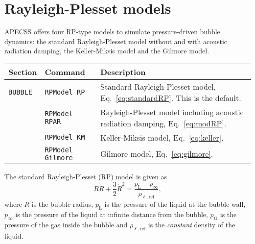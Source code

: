 \section{Rayleigh-Plesset models}
\label{sec:rpmodels}

APECSS offers four RP-type models to simulate pressure-driven bubble dynamics: the standard Rayleigh-Plesset model without and with acoustic radiation damping, the Keller-Miksis model and the Gilmore model.

\vspace{0.8em}

\noindent
\begin{tabular}{p{} p{} p{}}
    \textbf{Section} &\textbf{Command} & \textbf{Description} 
\vspace{1mm} \\ \hline
{\tt BUBBLE} & {\tt RPModel RP} & Standard Rayleigh-Plesset model, Eq.~\eqref{eq:standardRP}. This is the default.\\ 
 & {\tt RPModel RPAR} & Rayleigh-Plesset model including acoustic radiation damping, Eq.~\eqref{eq:modRP}.\\ 
 & {\tt RPModel KM} & Keller-Miksis model, Eq.~\eqref{eq:keller}.\\ 
 & {\tt RPModel Gilmore} & Gilmore model, Eq.~\eqref{eq:gilmore}.\\ 
 \hline
\end{tabular} \vspace{1em}

\noindent The standard Rayleigh-Plesset (RP) model is given as \citep{Lauterborn2010}
\begin{equation}
R \ddot{R} + \frac{3}{2} \dot{R}^2 = \frac{p_\text{L} - p_\infty}{\rho_{\ell,\mathrm{ref}}},
\label{eq:standardRP}
\end{equation}
where $R$ is the bubble radius, $p_\text{L}$ is the pressure of the liquid at the bubble wall, $p_\infty$ is the pressure of the liquid at infinite distance from the bubble, $p_\text{G}$ is the pressure of the gas inside the bubble and $\rho_{\ell,\mathrm{ref}}$ is the {\it constant} density of the liquid.

